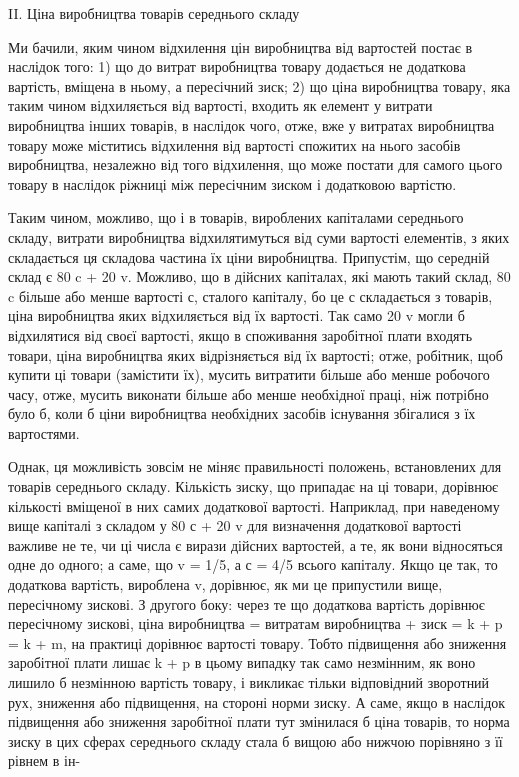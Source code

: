 II. Ціна виробництва товарів середнього складу

       Ми бачили, яким чином відхилення цін виробництва від вартостей постає в наслідок того:
       1) що до витрат виробництва товару додається не додаткова вартість, вміщена в ньому, а
пересічний зиск;
       2) що ціна виробництва товару, яка таким чином відхиляється від вартості, входить як елемент
у витрати виробництва інших товарів, в наслідок чого, отже, вже у витратах виробництва товару може
міститись відхилення від вартості спожитих на нього засобів виробництва, незалежно від того
відхилення, що може постати для самого цього товару в наслідок ріжниці між пересічним зиском і
додатковою вартістю.

Таким чином, можливо, що і в товарів, вироблених капіталами середнього складу, витрати виробництва
відхилятимуться від суми вартості елементів, з яких складається ця складова частина їх ціни
виробництва. Припустім, що середній склад є 80 c + 20 v. Можливо, що в дійсних капіталах, які мають
такий склад, 80  c більше або менше вартості с, сталого капіталу, бо це с складається з товарів,
ціна виробництва яких відхиляється від їх вартості. Так само 20 v  могли б відхилятися від своєї
вартості, якщо в споживання заробітної плати входять товари, ціна виробництва яких відрізняється від
їх вартості; отже, робітник, щоб купити ці товари (замістити їх), мусить витратити більше або менше
робочого часу, отже, мусить виконати більше або менше необхідної праці, ніж потрібно було б, коли б
ціни виробництва
необхідних засобів існування збігалися з їх вартостями.

        Однак, ця можливість зовсім не міняє правильності положень, встановлених для товарів
середнього складу. Кількість зиску, що припадає на ці товари, дорівнює кількості вміщеної в них
самих додаткової вартості. Наприклад, при наведеному вище капіталі з складом у 80 с + 20 v для
визначення додаткової вартості важливе не те, чи ці числа є вирази дійсних вартостей, а те, як вони
відносяться одне до одного; а саме, що v = 1/5, а с = 4/5  всього капіталу. Якщо це так, то
додаткова вартість, вироблена v, дорівнює, як ми це припустили вище, пересічному зискові. З другого
боку: через те що додаткова вартість дорівнює пересічному зискові, ціна виробництва = витратам
виробництва + зиск = k + p = k + m, на практиці дорівнює вартості товару. Тобто підвищення або
зниження заробітної плати лишає k + p  в цьому випадку так само незмінним, як воно лишило б
незмінною вартість товару, і викликає тільки відповідний зворотний рух,
зниження або підвищення, на стороні норми зиску. А саме, якщо в наслідок підвищення або зниження
заробітної плати тут змінилася б ціна товарів, то норма зиску в цих сферах середнього складу стала б
вищою або нижчою порівняно з її рівнем в ін-
